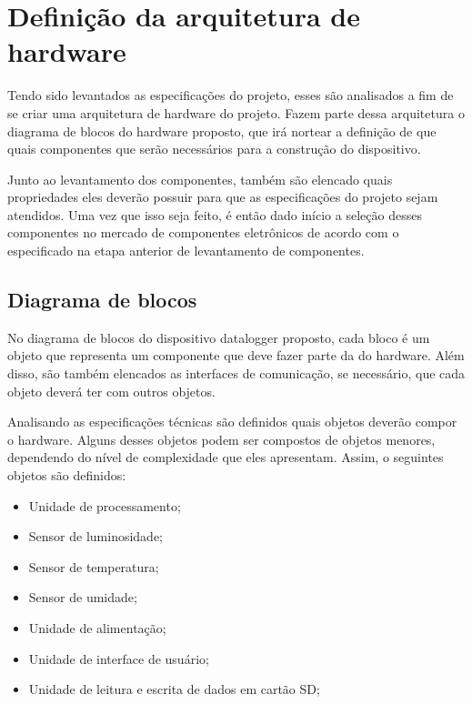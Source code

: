 \section{Definição da arquitetura de hardware}

Tendo sido levantados as especificações do projeto, esses são analisados a fim de se criar uma arquitetura de hardware do projeto. Fazem parte dessa arquitetura o diagrama de blocos do hardware proposto, que irá nortear a definição de que quais componentes que serão necessários para a construção do dispositivo. 

Junto ao levantamento dos componentes, também são elencado quais propriedades eles deverão possuir para que as especificações do projeto sejam atendidos. Uma vez que isso seja feito, é então dado início a seleção desses componentes no mercado de componentes eletrônicos de acordo com o especificado na etapa anterior de levantamento de componentes.

\subsection{Diagrama de blocos}

No diagrama de blocos do dispositivo datalogger proposto, cada bloco é um objeto que representa um componente que deve fazer parte da do hardware. Além disso, são também elencados as interfaces de comunicação, se necessário, que cada objeto deverá ter com outros objetos. 

Analisando as especificações técnicas são definidos quais objetos deverão compor  o hardware. Alguns desses objetos podem ser compostos de objetos menores, dependendo do nível de complexidade que eles apresentam. Assim, o seguintes objetos são definidos:

 \begin{itemize}
     \item Unidade de processamento;
     \item Sensor de luminosidade;
     \item Sensor de temperatura; 
     \item Sensor de umidade;
     \item Unidade de alimentação;
     \item Unidade de interface de usuário;
     \item Unidade de leitura e escrita de dados em cartão SD;
 \end{itemize}

